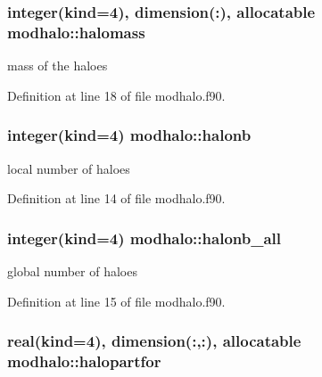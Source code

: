 \subsubsection[{\texorpdfstring{halomass}{halomass}}]{\setlength{\rightskip}{0pt plus 5cm}integer(kind=4), dimension(\+:), allocatable modhalo\+::halomass}\hypertarget{namespacemodhalo_a22da1dc93c68210ac3c692f1fb545bc0}{}\label{namespacemodhalo_a22da1dc93c68210ac3c692f1fb545bc0}


mass of the haloes 



Definition at line 18 of file modhalo.\+f90.

\subsubsection[{\texorpdfstring{halonb}{halonb}}]{\setlength{\rightskip}{0pt plus 5cm}integer(kind=4) modhalo\+::halonb}\hypertarget{namespacemodhalo_a7a64076c8448a822872da06cfb3e98f6}{}\label{namespacemodhalo_a7a64076c8448a822872da06cfb3e98f6}


local number of haloes 



Definition at line 14 of file modhalo.\+f90.

\subsubsection[{\texorpdfstring{halonb\+\_\+all}{halonb_all}}]{\setlength{\rightskip}{0pt plus 5cm}integer(kind=4) modhalo\+::halonb\+\_\+all}\hypertarget{namespacemodhalo_a8e5ab9d4d7316b9c26af34ac45a088ef}{}\label{namespacemodhalo_a8e5ab9d4d7316b9c26af34ac45a088ef}


global number of haloes 



Definition at line 15 of file modhalo.\+f90.

\subsubsection[{\texorpdfstring{halopartfor}{halopartfor}}]{\setlength{\rightskip}{0pt plus 5cm}real(kind=4), dimension(\+:,\+:), allocatable modhalo\+::halopartfor}\hypertarget{namespacemodhalo_aa850def902800d1eb780c6e4bd47edb9}{}\label{namespacemodhalo_aa850def902800d1eb780c6e4bd47edb9}


